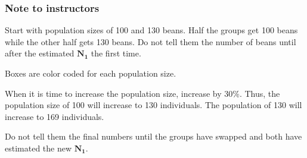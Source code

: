 \documentclass[12pt, hidelinks]{exam}
\begin{document}
\ifprintanswers \bfseries

\subsubsection*{Note to instructors}

Start with population sizes of 100 and 130 beans. Half the groups get 100 beans while the other half gets 130 beans. Do not tell them the number of beans until after the estimated $\symbf{N_1}$ the first time.

Boxes are color coded for each population size.

When it is time to increase the population size, increase by 30\%. Thus, the population size of 100 will increase to 130 individuals. The population of 130 will increase to 169 individuals.

Do not tell them the final numbers until the groups have swapped and both have estimated the new $\symbf{N_1}$.

\fi	
\end{document}
